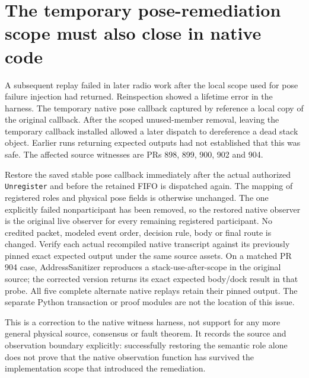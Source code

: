 \documentclass{article}
\begin{document}
\section*{The temporary pose-remediation scope must also close in native code}
A subsequent replay failed in later radio work after the local
scope used for pose failure injection had returned. Reinspection
showed a lifetime error in the harness. The temporary native
pose callback captured by reference a local copy of the original
callback. After the scoped unused-member removal, leaving the
temporary callback installed allowed a later dispatch to
dereference a dead stack object. Earlier runs returning expected
outputs had not established that this was safe. The affected
source witnesses are PRs 898, 899, 900, 902 and 904.

Restore the saved stable pose callback immediately after the
actual authorized \texttt{Unregister} and before the retained
FIFO is dispatched again. The mapping of registered roles and
physical pose fields is otherwise unchanged. The one explicitly
failed nonparticipant has been removed, so the restored native
observer is the original live observer for every remaining
registered participant. No credited packet, modeled event order,
decision rule, body or final route is changed. Verify each
actual recompiled native transcript against its previously
pinned exact expected output under the same source assets.
On a matched PR 904 case, AddressSanitizer reproduces a
stack-use-after-scope in the original source; the corrected version
returns its exact expected body/dock result in that probe. All five
complete alternate native replays retain their pinned output. The separate Python transaction or proof modules are not
the location of this issue.

This is a correction to the native witness harness, not support
for any more general physical source, consensus or fault
theorem. It records the source and observation boundary explicitly:
successfully restoring the semantic role alone does not prove that
the native observation function has survived the implementation
scope that introduced the remediation.
\end{document}
